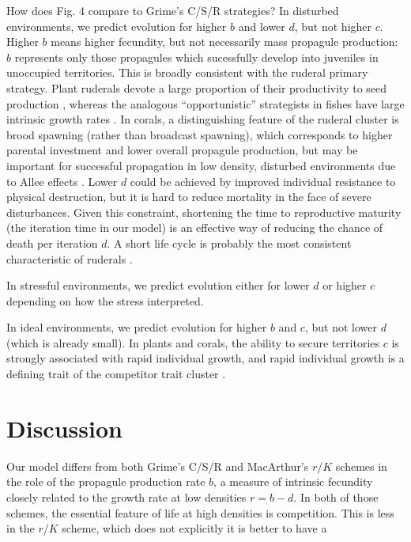 \documentclass[11pt]{article}
\begin{document}
How does Fig. 4 compare to Grime's C/S/R strategies? In disturbed environments, we predict evolution for higher $b$ and lower $d$, but not higher $c$. Higher $b$ means higher fecundity, but not necessarily mass propagule production: $b$ represents only those propagules which sucessfully develop into juveniles in unoccupied territories. This is broadly consistent with the ruderal primary strategy. Plant ruderals devote a large proportion of their productivity to seed production \cite{grime_1977}, whereas the analogous ``opportunistic'' strategists in fishes have large intrinsic growth rates \citep{winemiller_1992}. In corals, a distinguishing feature of the ruderal cluster is brood spawning (rather than broadcast spawning), which corresponds to higher parental investment and lower overall propagule production, but may be important for successful propagation in low density, disturbed environments due to Allee effects \citep{darling_2012}. Lower $d$ could be achieved by improved individual resistance to physical destruction, but it is hard to reduce mortality in the face of severe disturbances. Given this constraint, shortening the time to reproductive maturity (the iteration time in our model) is an effective way of reducing the chance of death per iteration $d$. A short life cycle is probably the most consistent characteristic of ruderals \cite{grime_1977,winemiller_1992,darling_2012}.

In stressful environments, we predict evolution either for lower $d$ or higher $c$ depending on how the stress interpreted. 

In ideal environments, we predict evolution for higher $b$ and $c$, but not lower $d$ (which is already small). In plants and corals, the ability to secure territories $c$ is strongly associated with rapid individual growth, and rapid individual growth is a defining trait of the competitor trait cluster \cite{grime_1977,winemiller_1992,darling_2012}. 



\section*{Discussion}





Our model differs from both Grime's C/S/R and MacArthur's $r$/$K$ schemes in the role of the propagule production rate $b$, a measure of intrinsic fecundity closely related to the growth rate at low densities $r=b-d$. In both of those schemes, the essential feature of life at high densities is competition. This is less  in the $r$/$K$ scheme, which does not explicitly  it is better to have a
\end{document}
